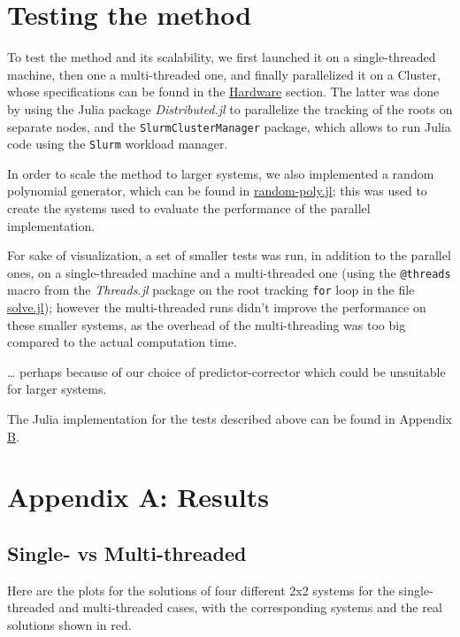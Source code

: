\documentclass[a4paper]{article}
\theoremstyle{definition}
\theoremstyle{definition}
\theoremstyle{remark}
\theoremstyle{definition}
\begin{document}
\section{Testing the method}
To test the method and its scalability, we first launched it on a single-threaded machine, then one a multi-threaded one, and finally parallelized it on a Cluster, whose specifications can be found in the
\hyperref[sec:hw]{Hardware} section.
The latter was done by using the Julia package \textit{Distributed.jl} to parallelize the tracking of the roots on separate nodes, and the \texttt{SlurmClusterManager} package, which allows
to run Julia code using the \texttt{Slurm} workload manager.

In order to scale the method to larger systems, we also implemented a random polynomial generator, which can be found in \hyperref[sec:random]{random-poly.jl}; this was used to
create the systems used to evaluate the performance of the parallel implementation.

For sake of visualization, a set of smaller tests was run, in addition to the parallel ones, on a single-threaded machine and a multi-threaded one (using the \texttt{@threads}
macro from the \textit{Threads.jl} package on the root tracking \texttt{for} loop in the file \hyperref[sec:listing]{solve.jl}); however the multi-threaded runs didn't improve the
performance on these smaller systems, as the overhead of the multi-threading was too big compared to the actual computation time.

\ldots
perhaps because of our choice of predictor-corrector which could be unsuitable for larger systems.

The Julia implementation for the tests described above can be found in Appendix \hyperref[sec:listing]{B}.

\section{Appendix A: Results}\label{sec:results}

\subsection{Single- vs Multi-threaded}

Here are the plots for the solutions of four different 2x2 systems for the single-threaded and multi-threaded cases, with the corresponding systems and the real solutions shown in
red.
\end{document}
